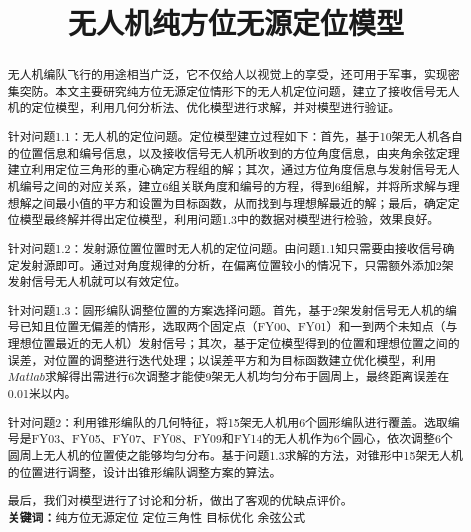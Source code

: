 \documentclass[12pt]{ctexart}
\title{\vspace{-1.5cm} \zihao{3} \heiti 无人机纯方位无源定位模型}
\date{}
\begin{document}
\begin{spacing}{1.5}
	
\maketitle	%
\setcounter{page}{1}  %

\vspace{-6.5em}

\begin{abstract}
	\setlength
	无人机编队飞行的用途相当广泛，它不仅给人以视觉上的享受，还可用于军事，实现密集突防。本文主要研究纯方位无源定位情形下的无人机定位问题，建立了接收信号无人机的定位模型，利用几何分析法、优化模型进行求解，并对模型进行验证。
	
	{\heiti 针对问题1.1：}无人机的定位问题。定位模型建立过程如下：首先，基于10架无人机各自的位置信息和编号信息，以及接收信号无人机所收到的方位角度信息，由夹角余弦定理建立利用定位三角形的重心确定方程组的解；其次，通过方位角度信息与发射信号无人机编号之间的对应关系，建立6组关联角度和编号的方程，得到6组解，并将所求解与理想解之间最小值的平方和设置为目标函数，从而找到与理想解最近的解；最后，确定定位模型最终解并得出定位模型，利用问题1.3中的数据对模型进行检验，效果良好。
	
	{\heiti 针对问题1.2：}发射源位置位置时无人机的定位问题。由问题1.1知只需要由接收信号确定发射源即可。通过对角度规律的分析，在偏离位置较小的情况下，只需额外添加2架发射信号无人机就可以有效定位。
	
	{\heiti 针对问题1.3：}圆形编队调整位置的方案选择问题。首先，基于2架发射信号无人机的编号已知且位置无偏差的情形，选取两个固定点（FY00、FY01）和一到两个未知点（与理想位置最近的无人机）发射信号；其次，基于定位模型得到的位置和理想位置之间的误差，对位置的调整进行迭代处理；以误差平方和为目标函数建立优化模型，利用$Matlab$求解得出需进行6次调整才能使9架无人机均匀分布于圆周上，最终距离误差在0.01米以内。
	
	{\heiti 针对问题2：}利用锥形编队的几何特征，将15架无人机用6个圆形编队进行覆盖。选取编号是FY03、FY05、FY07、FY08、FY09和FY14的无人机作为6个圆心，依次调整6个圆周上无人机的位置使之能够均匀分布。基于问题1.3求解的方法，对锥形中15架无人机的位置进行调整，设计出锥形编队调整方案的算法。
	
	最后，我们对模型进行了讨论和分析，做出了客观的优缺点评价。\\
	\textbf{关键词：}纯方位无源定位 \quad 定位三角性 \quad 目标优化 \quad 余弦公式
\end{abstract}


\end{spacing}
\end{document}
